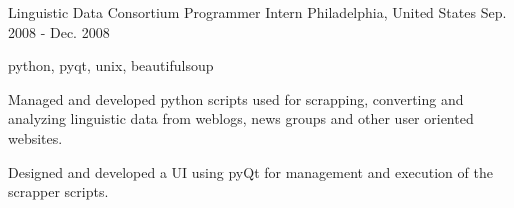 \cventry
    {Linguistic Data Consortium} %
    {Programmer Intern} %
    {Philadelphia, United States} %
    {Sep. 2008 - Dec. 2008} %
    {
    \begin{cvitems} %
        \item { python, pyqt, unix, beautifulsoup}
        \item { Managed and developed python scripts used for scrapping, converting and analyzing linguistic data from weblogs, news groups and other user oriented websites.}
        \item { Designed and developed a UI using pyQt for management and execution of the scrapper scripts.}
    \end{cvitems}
    }